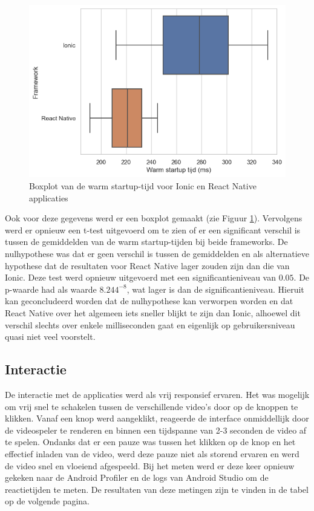 \begin{figure}
  \centering
  \includegraphics[width=0.7\linewidth]{img/boxplotWarm}
  \caption{Boxplot van de warm startup-tijd voor Ionic en React Native applicaties}
  \label{fig:Boxplot van de warm startup-tijd voor Ionic en React Native applicaties}
\end{figure}

Ook voor deze gegevens werd er een boxplot gemaakt (zie Figuur \ref{fig:Boxplot van de warm startup-tijd voor Ionic en React Native applicaties}). Vervolgens werd er opnieuw een t-test uitgevoerd om te zien of er een significant verschil is tussen de gemiddelden van de warm startup-tijden bij beide frameworks. De nulhypothese was dat er geen verschil is tussen de gemiddelden en als alternatieve hypothese dat de resultaten voor React Native lager zouden zijn dan die van Ionic. Deze test werd opnieuw uitgevoerd met een significantieniveau van \(0.05\). De p-waarde had als waarde \(8.244^{-8}\), wat lager is dan de significantieniveau. Hieruit kan geconcludeerd worden dat de nulhypothese kan verworpen worden en dat React Native over het algemeen iets sneller blijkt te zijn dan Ionic, alhoewel dit verschil slechts over enkele milliseconden gaat en eigenlijk op gebruikersniveau quasi niet veel voorstelt.


\subsection{Interactie}
\label{subsec:interactie}

De interactie met de applicaties werd als vrij responsief ervaren. Het was mogelijk om vrij snel te schakelen tussen de verschillende video's door op de knoppen te klikken. Vanaf een knop werd aangeklikt, reageerde de interface onmiddellijk door de videospeler te renderen en binnen een tijdspanne van 2-3 seconden de video af te spelen. Ondanks dat er een pauze was tussen het klikken op de knop en het effectief inladen van de video, werd deze pauze niet als storend ervaren en werd de video snel en vloeiend afgespeeld. Bij het meten werd er deze keer opnieuw gekeken naar de Android Profiler en de logs van Android Studio om de reactietijden te meten. De resultaten van deze metingen zijn te vinden in de tabel op de volgende pagina.

